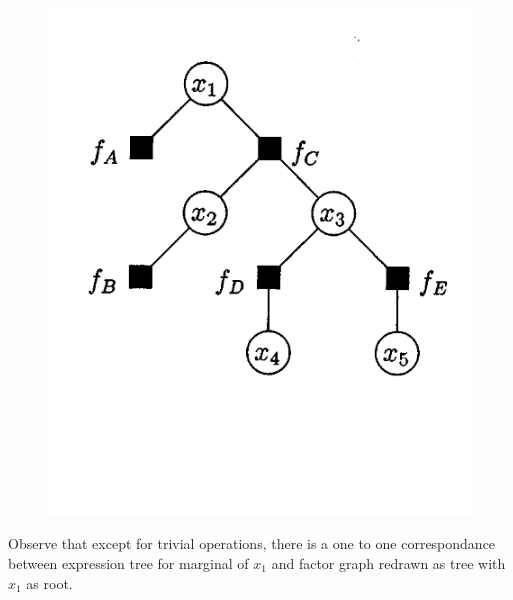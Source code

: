 \documentclass[letterpaper,english,10pt]{article}
\begin{document}
\begin{exmp}
\begin{figure}[htb]
\begin{minipage}[t]{.5\textwidth}
\end{minipage}%
\begin{minipage}[t]{.5\textwidth}
  \centering
  \includegraphics[width=.45\linewidth]{exmpl_5_pic_2.png}
\end{minipage}
\end{figure}
\newline
Observe that except for trivial operations, there is a one to one correspondance between expression tree for marginal of $x_1$ and factor graph
redrawn as tree with $x_1$ as root.
\end{exmp}
\end{document}
